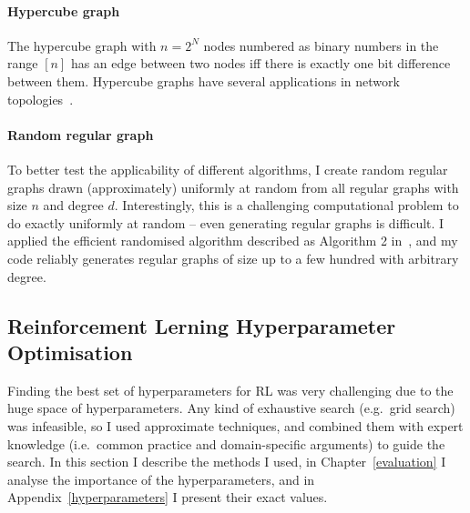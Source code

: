 \paragraph{Hypercube graph} The hypercube graph with $n=2^N$ nodes numbered as binary numbers in the range $[n]$ has an edge between two nodes iff there is exactly one bit difference between them. Hypercube graphs have several applications in network topologies~\cite{ostrouchov1987hypercubenetwork}.


\paragraph{Random regular graph} To better test the applicability of different algorithms, I create random regular graphs drawn (approximately) uniformly at random from all regular graphs with size $n$ and degree $d$. Interestingly, this is a challenging computational problem to do exactly uniformly at random -- even generating regular graphs is difficult. I applied the efficient randomised algorithm described as Algorithm 2 in~\cite{steger1999randomregulargraphs}, and my code reliably generates regular graphs of size up to a few hundred with arbitrary degree.


\subsection{Reinforcement Lerning Hyperparameter Optimisation}

Finding the best set of hyperparameters for RL was very challenging due to the huge space of hyperparameters. Any kind of exhaustive search (e.g.\ grid search) was infeasible, so I used approximate techniques, and combined them with expert knowledge (i.e.\ common practice and domain-specific arguments) to guide the search.
In this section I describe the methods I used, in Chapter~\ref{evaluation} I analyse the importance of the hyperparameters, and in Appendix~\ref{hyperparameters} I present their exact values.


